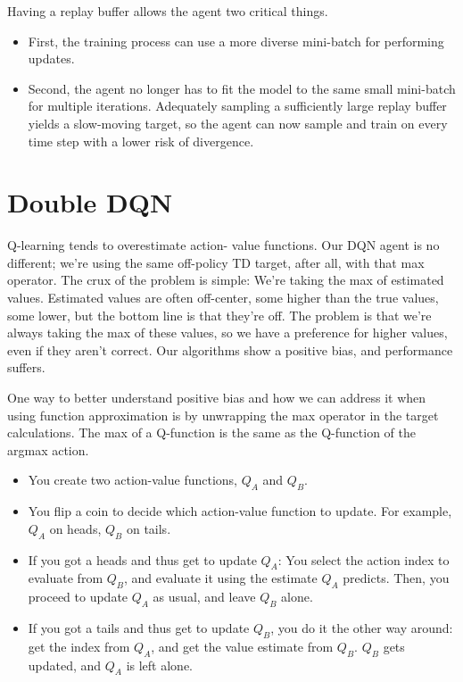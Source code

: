 Having a replay buffer allows the agent two critical things. 
\begin{itemize}
	\item First, the training process can use a more diverse mini-batch for performing updates. 
	\item Second, the agent no longer has to fit the model to the same small mini-batch for multiple iterations. Adequately sampling a sufficiently large replay buffer yields a slow-moving target, so the agent can now sample and train on every time step with a lower risk of divergence.
\end{itemize}


\section{Double DQN}
\label{sec:double_dqn}

 Q-learning tends to overestimate action- value functions. Our DQN agent is no different; we're using the same off-policy TD target, after all, with that max operator. The crux of the problem is simple: We’re taking the max of estimated values. Estimated values are often off-center, some higher than the true values, some lower, but the bottom line is that they’re off. The problem is that we’re always taking the max of these values, so we have a preference for higher values, even if they aren't correct. Our algorithms show a positive bias, and performance suffers.

One way to better understand positive bias and how we can address it when using function approximation is by unwrapping the max operator in the target calculations. The max of a Q-function is the same as the Q-function of the argmax action.

\begin{itemize}
	\item You create two action-value functions, $Q_A$ and $Q_B$.
	\item You flip a coin to decide which action-value function to update. For example, $Q_A$ on heads, $Q_B$ on tails. 
	\item If you got a heads and thus get to update $Q_A$: You select the action index to evaluate from $Q_B$, and evaluate it using the estimate $Q_A$ predicts. Then, you proceed to update $Q_A$ as usual, and leave $Q_B$ alone. 
	\item If you got a tails and thus get to update $Q_B$, you do it the other way around: get the index from $Q_A$, and get the value estimate from $Q_B$. $Q_B$ gets updated, and $Q_A$ is left alone.
\end{itemize}

